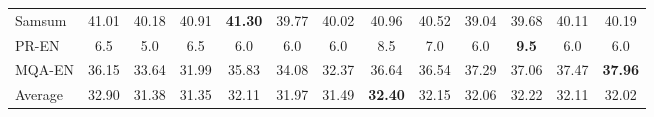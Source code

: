 \begin{table}[t]
\begin{tabular}{lcccc|cc|cc|cc|cc}
Samsum  & 41.01 & 40.18 & 40.91 & \textbf{41.30} & 39.77 & 40.02 & 40.96 & 40.52 & 39.04 & 39.68 & 40.11 & 40.19\\
PR-EN & 6.5 & 5.0   & 6.5  & 6.0  & 6.0   & 6.0 & 8.5 & 7.0 & 6.0 & \textbf{9.5} & 6.0 & 6.0\\
MQA-EN    & 36.15 & 33.64 & 31.99 & 35.83 & 34.08 & 32.37 & 36.64 & 36.54 & 37.29 & 37.06 & 37.47 & \textbf{37.96}\\
\midrule
Average   & 32.90 & 31.38 & 31.35 & 32.11 & 31.97 & 31.49 & \textbf{32.40} & 32.15 & 32.06 & 32.22 & 32.11 & 32.02\\
\bottomrule
\end{tabular}
\end{table}
